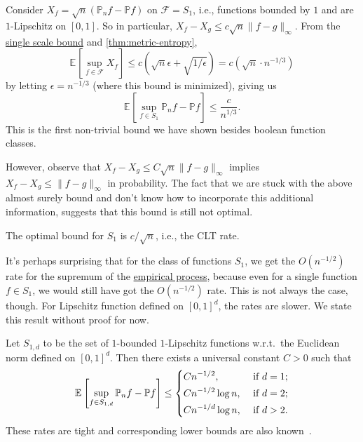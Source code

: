 \begin{eg}\label{eg:non-optimal-EP-supremum-S1}
	Consider \(X_f = \sqrt{n} (\mathbb{P} _n f - \mathbb{P} f)\) on \(\mathscr{F} = S_1\), i.e., functions bounded by \(1\) and are \(1\)-Lipschitz on \([0, 1]\). So in particular, \(X_f - X_g \leq c \sqrt{n} \lVert f - g \rVert _\infty\). From the \hyperref[lma:single-scale-bound]{single scale bound} and \autoref{thm:metric-entropy},
	\[
		\mathbb{E}_{}\left[\sup _{f\in \mathscr{F} } X_f \right]
		\leq c \left(\sqrt{n} \epsilon + \sqrt{1 / \epsilon } \right)
		= c(\sqrt{n} \cdot n^{-1 / 3})
	\]
	by letting \(\epsilon = n^{-1 / 3}\) (where this bound is minimized), giving us
	\[
		\mathbb{E}_{}\left[\sup _{f\in S_1}\mathbb{P} _n f - \mathbb{P} f \right] \leq \frac{c}{n^{1 / 3}}.
	\]
	This is the first non-trivial bound we have shown besides boolean function classes.

	However, observe that \(X_f - X_g \leq C \sqrt{n} \lVert f - g \rVert _\infty \) implies \(X_f - X_g \leq \lVert f - g \rVert _\infty \) in probability. The fact that we are stuck with the above almost surely bound and don't know how to incorporate this additional information, suggests that this bound is still not optimal.
	\begin{remark}
		The optimal bound for \(S_1\) is \(c / \sqrt{n} \), i.e., the CLT rate.
	\end{remark}
\end{eg}

It's perhaps surprising that for the class of functions \(S_1\), we get the \(O(n^{-1 / 2})\) rate for the supremum of the \hyperref[def:EP]{empirical process}, because even for a single function \(f\in S_1\), we would still have got the \(O(n^{-1 / 2})\) rate. This is not always the case, though. For Lipschitz function defined on \([0, 1]^d\), the rates are slower. We state this result without proof for now.

\begin{lemma}\label{lma:lec11}
	Let \(S_{1, d}\) to be the set of \(1\)-bounded \(1\)-Lipschitz functions w.r.t.\ the Euclidean norm defined on \([0, 1]^d\). Then there exists a universal constant \(C > 0\) such that
	\[
		\mathbb{E}_{}\left[\sup _{f\in S_{1, d}} \mathbb{P} _n f - \mathbb{P} f\right]
		\leq \begin{dcases}
			C n^{-1 / 2},       & \text{ if } d = 1 ; \\
			Cn^{-1 / 2} \log n, & \text{ if } d = 2 ; \\
			Cn^{-1 / d} \log n, & \text{ if } d > 2 . \\
		\end{dcases}
	\]
	These rates are tight and corresponding lower bounds are also known~\cite[Problem 5.11 (d)]{noauthororeditor}.
\end{lemma}